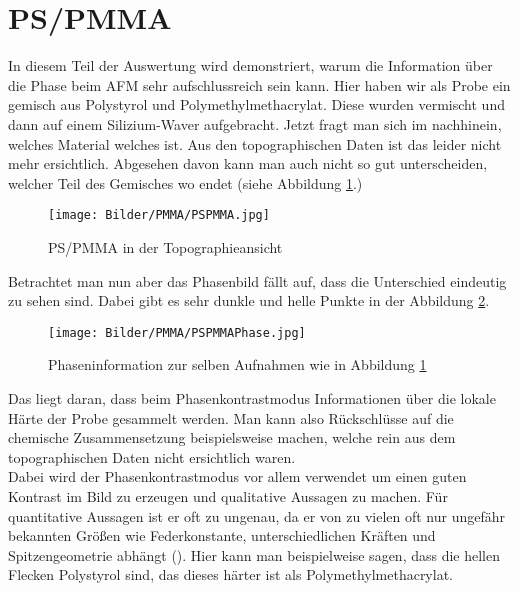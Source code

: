 \clearpage
\section{PS/PMMA}

In diesem Teil der Auswertung wird demonstriert, warum die Information über die Phase beim AFM sehr aufschlussreich sein kann. Hier haben wir 
als Probe ein gemisch aus Polystyrol und Polymethylmethacrylat. Diese wurden vermischt und dann auf einem Silizium-Waver aufgebracht. 
Jetzt fragt man sich im nachhinein, welches Material welches ist. Aus den topographischen Daten ist das leider nicht mehr ersichtlich. Abgesehen davon kann man auch 
nicht so gut unterscheiden, welcher Teil des Gemisches wo endet (siehe Abbildung \ref{PMMA1}.)\\
\begin{figure}[h]
    \centering
    \texttt{[image: Bilder/PMMA/PSPMMA.jpg]}
    \caption{PS/PMMA in der Topographieansicht}
    \label{PMMA1}
\end{figure}

Betrachtet man nun aber das Phasenbild fällt auf, dass die Unterschied eindeutig zu sehen sind. Dabei gibt es sehr dunkle und helle Punkte 
in der Abbildung \ref{PMMA2}.\\

\begin{figure}
    \centering
    \texttt{[image: Bilder/PMMA/PSPMMAPhase.jpg]}
    \caption{Phaseninformation zur selben Aufnahmen wie in Abbildung \ref{PMMA1}}
    \label{PMMA2}
\end{figure}

Das liegt daran, dass beim Phasenkontrastmodus Informationen über die lokale Härte der Probe gesammelt werden. Man kann also 
Rückschlüsse auf die chemische Zusammensetzung beispielsweise machen, welche rein aus dem topographischen Daten nicht ersichtlich waren.\\
Dabei wird der Phasenkontrastmodus vor allem verwendet um einen guten Kontrast im Bild zu erzeugen und qualitative Aussagen zu machen. 
Für quantitative Aussagen ist er oft zu ungenau, da er von zu vielen oft nur ungefähr bekannten Größen wie Federkonstante, unterschiedlichen Kräften und Spitzengeometrie 
abhängt (\cite[S.68]{SampleKit2007}).
Hier kann man beispielweise sagen, dass die hellen Flecken Polystyrol sind, das dieses härter ist als Polymethylmethacrylat\footnotemark.
